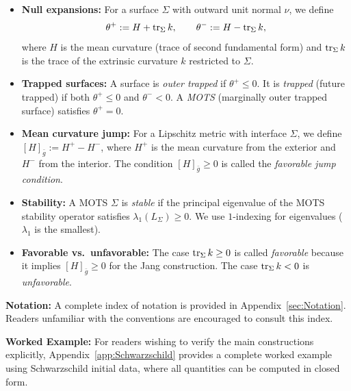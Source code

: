 \begin{itemize}
    \item \textbf{Null expansions:} For a surface $\Sigma$ with outward unit normal $\nu$, we define
    \begin{equation}
        \theta^+ := H + \operatorname{tr}_\Sigma k, \qquad \theta^- := H - \operatorname{tr}_\Sigma k,
    \end{equation}
    where $H$ is the mean curvature (trace of second fundamental form) and $\operatorname{tr}_\Sigma k$ is the trace of the extrinsic curvature $k$ restricted to $\Sigma$.
    
    \item \textbf{Trapped surfaces:} A surface is \emph{outer trapped} if $\theta^+ \le 0$. It is \emph{trapped} (future trapped) if both $\theta^+ \le 0$ and $\theta^- < 0$. A \emph{MOTS} (marginally outer trapped surface) satisfies $\theta^+ = 0$.
    
    \item \textbf{Mean curvature jump:} For a Lipschitz metric with interface $\Sigma$, we define $[H]_{\bar{g}} := H^+ - H^-$, where $H^+$ is the mean curvature from the exterior and $H^-$ from the interior. The condition $[H]_{\bar{g}} \ge 0$ is called the \emph{favorable jump condition}.
    
    \item \textbf{Stability:} A MOTS $\Sigma$ is \emph{stable} if the principal eigenvalue of the MOTS stability operator satisfies $\lambda_1(L_\Sigma) \ge 0$. We use $1$-indexing for eigenvalues ($\lambda_1$ is the smallest).
    
    \item \textbf{Favorable vs.\ unfavorable:} The case $\operatorname{tr}_\Sigma k \ge 0$ is called \emph{favorable} because it implies $[H]_{\bar{g}} \ge 0$ for the Jang construction. The case $\operatorname{tr}_\Sigma k < 0$ is \emph{unfavorable}.
\end{itemize}

\begin{remark}
\textbf{Notation:} A complete index of notation is provided in Appendix~\ref{sec:Notation}. Readers unfamiliar with the conventions are encouraged to consult this index.

\textbf{Worked Example:} For readers wishing to verify the main constructions explicitly, Appendix~\ref{app:Schwarzschild} provides a complete worked example using Schwarzschild initial data, where all quantities can be computed in closed form.
\end{remark}

